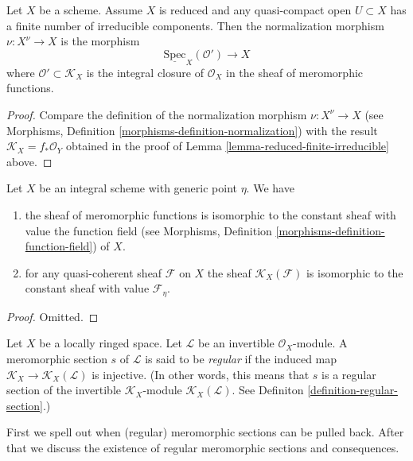 \begin{lemma}
\label{lemma-reduced-normalization}
Let $X$ be a scheme.
Assume $X$ is reduced and any quasi-compact open $U \subset X$
has a finite number of irreducible components.
Then the normalization morphism $\nu : X^\nu \to X$ is the
morphism
$$
\underline{\text{Spec}}_X(\mathcal{O}') \longrightarrow X
$$
where $\mathcal{O}' \subset \mathcal{K}_X$ is the integral
closure of $\mathcal{O}_X$ in the sheaf of meromorphic functions.
\end{lemma}

\begin{proof}
Compare the definition of the normalization morphism
$\nu : X^\nu \to X$ (see
Morphisms, Definition \ref{morphisms-definition-normalization})
with the result $\mathcal{K}_X = f_*\mathcal{O}_Y$ obtained
in the proof of Lemma \ref{lemma-reduced-finite-irreducible} above.
\end{proof}

\begin{lemma}
\label{lemma-meromorphic-functions-integral-scheme}
Let $X$ be an integral scheme with generic point $\eta$. We have
\begin{enumerate}
\item the sheaf of meromorphic functions is
isomorphic to the constant sheaf with value the
function field (see
Morphisms, Definition \ref{morphisms-definition-function-field})
of $X$.
\item for any quasi-coherent sheaf $\mathcal{F}$ on $X$ the
sheaf $\mathcal{K}_X(\mathcal{F})$ is isomorphic to the
constant sheaf with value $\mathcal{F}_\eta$.
\end{enumerate}
\end{lemma}

\begin{proof}
Omitted.
\end{proof}

\begin{definition}
\label{definition-regular-meromorphic-section}
Let $X$ be a locally ringed space.
Let $\mathcal{L}$ be an invertible $\mathcal{O}_X$-module.
A meromorphic section $s$ of $\mathcal{L}$ is said to be {\it regular}
if the induced map
$\mathcal{K}_X \to \mathcal{K}_X(\mathcal{L})$
is injective. (In other words, this means that $s$ is a regular
section of the invertible $\mathcal{K}_X$-module
$\mathcal{K}_X(\mathcal{L})$. See
Definiton \ref{definition-regular-section}.)
\end{definition}

\noindent
First we spell out when (regular) meromorphic sections can be pulled back.
After that we discuss the existence of regular meromorphic sections
and consequences.

